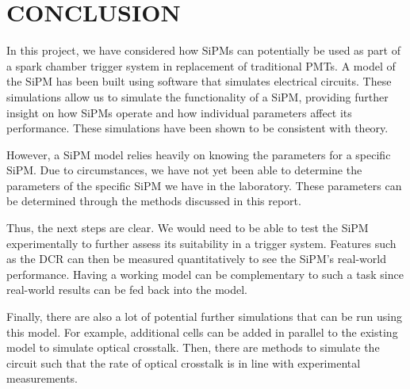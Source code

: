
\section{CONCLUSION}

In this project, we have considered how SiPMs can potentially be used as part of a spark chamber trigger system in replacement of traditional PMTs. A model of the SiPM has been built using software that simulates electrical circuits. These simulations allow us to simulate the functionality of a SiPM, providing further insight on how SiPMs operate and how individual parameters affect its performance. These simulations have been shown to be consistent with theory.

However, a SiPM model relies heavily on knowing the parameters for a specific SiPM. Due to circumstances, we have not yet been able to determine the parameters of the specific SiPM we have in the laboratory. These parameters can be determined through the methods discussed in this report.

Thus, the next steps are clear. We would need to be able to test the SiPM experimentally to further assess its suitability in a trigger system. Features such as the DCR can then be measured quantitatively to see the SiPM's real-world performance. Having a working model can be complementary to such a task since real-world results can be fed back into the model.

Finally, there are also a lot of potential further simulations that can be run using this model. For example, additional cells can be added in parallel to the existing model to simulate optical crosstalk. Then, there are methods to simulate the circuit such that the rate of optical crosstalk is in line with experimental measurements.
